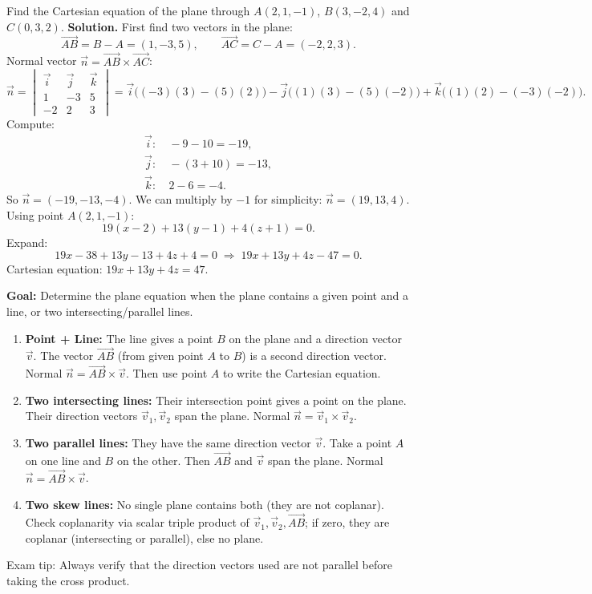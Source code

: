 \documentclass[11pt]{article}
\newcommand{\cle}[1]{{\popxbold\color{popdark}#1}}
\begin{document}
\begin{exoresolu}
Find the Cartesian equation of the plane through $A(2,1,-1)$, $B(3,-2,4)$ and $C(0,3,2)$.
\tcblower
\textbf{Solution.}
First find two vectors in the plane:
\[
\overrightarrow{AB}=B-A=(1,-3,5),\qquad
\overrightarrow{AC}=C-A=(-2,2,3).
\]
Normal vector $\vec{n}=\overrightarrow{AB}\times\overrightarrow{AC}$:
\[
\vec{n}=
\begin{vmatrix}
\vec{i} & \vec{j} & \vec{k} \\
1 & -3 & 5 \\
-2 & 2 & 3
\end{vmatrix}
=\vec{i}\bigl((-3)(3)-(5)(2)\bigr)-\vec{j}\bigl((1)(3)-(5)(-2)\bigr)+\vec{k}\bigl((1)(2)-(-3)(-2)\bigr).
\]
Compute:
\begin{align*}
\vec{i}:&\ -9-10=-19,\\
\vec{j}:&\ -(3+10)=-13,\\
\vec{k}:&\ 2-6=-4.
\end{align*}
So $\vec{n}=(-19,-13,-4)$. We can multiply by $-1$ for simplicity: $\vec{n}=(19,13,4)$.
Using point $A(2,1,-1)$:
\[
19(x-2)+13(y-1)+4(z+1)=0.
\]
Expand:
\[
19x-38+13y-13+4z+4=0\;\Longrightarrow\;19x+13y+4z-47=0.
\]
Cartesian equation: $\boxed{19x+13y+4z=47}$.
\end{exoresolu}

\begin{methode}
\textbf{Goal:} Determine the plane equation when the plane contains a given point and a line, or two intersecting/parallel lines.
\begin{enumerate}
\item \textbf{Point + Line:} The line gives a point $B$ on the plane and a direction vector $\vec{v}$. The vector $\overrightarrow{AB}$ (from given point $A$ to $B$) is a second direction vector. Normal $\vec{n}=\overrightarrow{AB}\times\vec{v}$. Then use point $A$ to write the Cartesian equation.
\item \textbf{Two intersecting lines:} Their intersection point gives a point on the plane. Their direction vectors $\vec{v}_1,\vec{v}_2$ span the plane. Normal $\vec{n}=\vec{v}_1\times\vec{v}_2$.
\item \textbf{Two parallel lines:} They have the same direction vector $\vec{v}$. Take a point $A$ on one line and $B$ on the other. Then $\overrightarrow{AB}$ and $\vec{v}$ span the plane. Normal $\vec{n}=\overrightarrow{AB}\times\vec{v}$.
\item \textbf{Two skew lines:} No single plane contains both (they are not coplanar). Check coplanarity via scalar triple product of $\vec{v}_1,\vec{v}_2,\overrightarrow{AB}$; if zero, they are coplanar (intersecting or parallel), else no plane.
\end{enumerate}
\cle{Exam tip:} Always verify that the direction vectors used are not parallel before taking the cross product.
\end{methode}
\end{document}
